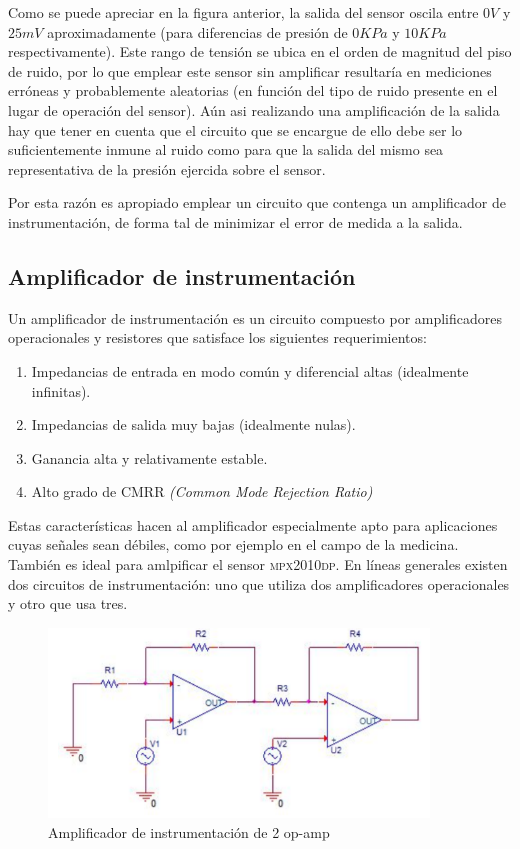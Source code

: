 Como se puede apreciar en la figura anterior, la salida del sensor oscila entre $0V$ y $25mV$ aproximadamente (para diferencias de presi\'on de $0KPa$ y $10KPa$ respectivamente). Este rango de tensi\'on se ubica en el orden de magnitud del piso de ruido, por lo que emplear este sensor sin amplificar resultar\'ia en mediciones err\'oneas y probablemente aleatorias (en funci\'on del tipo de ruido presente en el lugar de operaci\'on del sensor). A\'un asi realizando una amplificaci\'on de la salida hay que tener en cuenta que el circuito que se encargue de ello debe ser lo suficientemente inmune al ruido como para que la salida del mismo sea representativa de la presi\'on ejercida sobre el sensor.


Por esta raz\'on es apropiado emplear un circuito que contenga un amplificador de instrumentaci\'on, de forma tal de minimizar el error de medida a la salida. 

\subsection{Amplificador de instrumentaci\'on}

Un amplificador de instrumentaci\'on es un circuito compuesto por amplificadores operacionales y resistores que satisface los siguientes requerimientos:

\begin{enumerate}
		\item Impedancias de entrada en modo com\'un y diferencial altas (idealmente infinitas).
		\item Impedancias de salida muy bajas (idealmente nulas).
		\item Ganancia alta y relativamente estable.
		\item Alto grado de CMRR \textit{(Common Mode Rejection Ratio)}
\end{enumerate}

Estas caracter\'isticas hacen al amplificador especialmente apto para aplicaciones cuyas se\~nales sean d\'ebiles, como por ejemplo en el campo de la medicina. Tambi\'en es ideal para amlpificar el sensor \textsc{mpx2010dp}. En l\'ineas generales existen dos circuitos de instrumentaci\'on: uno que utiliza dos amplificadores operacionales y otro que usa tres.

\begin{figure}[H]
    \centering
    \includegraphics[width=0.9\textwidth]{../EJ4/resources/instrumental_2opamp.png}
    \caption{Amplificador de instrumentaci\'on de 2 op-amp}
    \label{fig:EJ4_instrumental_2opamp}
\end{figure}

